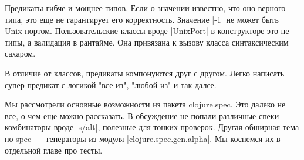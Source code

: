 Предикаты гибче и мощнее типов. Если о значении известно, что оно верного типа,
это еще не гарантирует его корректность. Значение \spverb|-1| не может быть
Unix-портом. Пользовательские классы вроде \spverb|UnixPort| в конструкторе это не
типы, а валидация в рантайме. Она привязана к вызову класса синтаксическим
сахаром.

В отличие от классов, предикаты компонуются друг с другом. Легко написать
супер-предикат с логикой "все из", "любой из" и так далее.

Мы рассмотрели основные возможности из пакета clojure.spec. Это далеко не все, о
чем еще можно рассказать. В обсуждение не попали различные спеки-комбинаторы
вроде \spverb|s/alt|, полезные для тонких проверок. Другая обширная тема по spec~---
генераторы из модуля \spverb|clojure.spec.gen.alpha|. Мы коснемся их в отдельной главе
про тесты.

